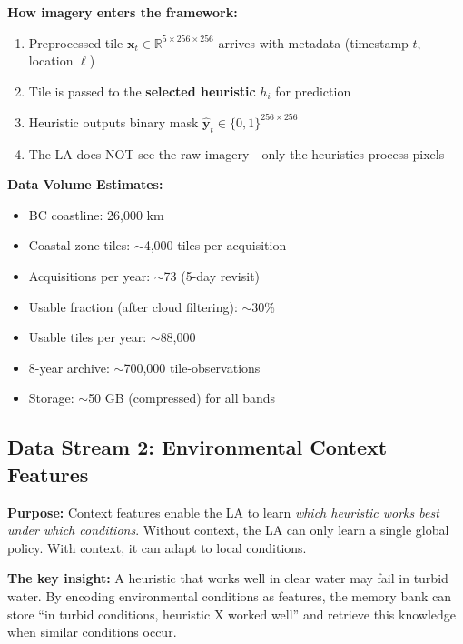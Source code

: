 \documentclass[11pt]{article}
\begin{document}
\textbf{How imagery enters the framework:}
\begin{enumerate}
    \item Preprocessed tile $\mathbf{x}_t \in \mathbb{R}^{5 \times 256 \times 256}$ arrives with metadata (timestamp $t$, location $\ell$)
    \item Tile is passed to the \textbf{selected heuristic} $h_i$ for prediction
    \item Heuristic outputs binary mask $\hat{\mathbf{y}}_t \in \{0,1\}^{256 \times 256}$
    \item The LA does NOT see the raw imagery---only the heuristics process pixels
\end{enumerate}

\textbf{Data Volume Estimates:}
\begin{itemize}
    \item BC coastline: 26,000 km
    \item Coastal zone tiles: $\sim$4,000 tiles per acquisition
    \item Acquisitions per year: $\sim$73 (5-day revisit)
    \item Usable fraction (after cloud filtering): $\sim$30\%
    \item Usable tiles per year: $\sim$88,000
    \item 8-year archive: $\sim$700,000 tile-observations
    \item Storage: $\sim$50 GB (compressed) for all bands
\end{itemize}

\subsection{Data Stream 2: Environmental Context Features}

\textbf{Purpose:} Context features enable the LA to learn \textit{which heuristic works best under which conditions}. Without context, the LA can only learn a single global policy. With context, it can adapt to local conditions.

\textbf{The key insight:} A heuristic that works well in clear water may fail in turbid water. By encoding environmental conditions as features, the memory bank can store ``in turbid conditions, heuristic X worked well'' and retrieve this knowledge when similar conditions occur.
\end{document}
